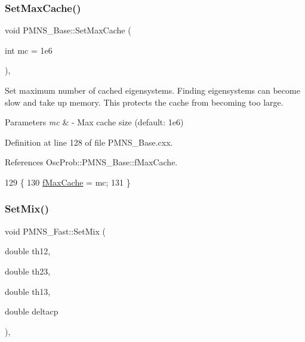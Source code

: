 \subsubsection{\texorpdfstring{Set\+Max\+Cache()}{SetMaxCache()}}
{\footnotesize\ttfamily void P\+M\+N\+S\+\_\+\+Base\+::\+Set\+Max\+Cache (\begin{DoxyParamCaption}\item[{int}]{mc = {\ttfamily 1e6} }\end{DoxyParamCaption})\hspace{0.3cm}{\ttfamily [virtual]}, {\ttfamily [inherited]}}

Set maximum number of cached eigensystems. Finding eigensystems can become slow and take up memory. This protects the cache from becoming too large.


\begin{DoxyParams}{Parameters}
{\em mc} & -\/ Max cache size (default\+: 1e6) \\
\hline
\end{DoxyParams}


Definition at line 128 of file P\+M\+N\+S\+\_\+\+Base.\+cxx.



References Osc\+Prob\+::\+P\+M\+N\+S\+\_\+\+Base\+::f\+Max\+Cache.


\begin{DoxyCode}
129 \{
130   \hyperlink{classOscProb_1_1PMNS__Base_a74c13356eafec2490d8c3c19759ba7f0}{fMaxCache} = mc;
131 \}
\end{DoxyCode}
\mbox{\label{classOscProb_1_1PMNS__Fast_ad849b2231d99c5d66fb3ade8efb896e1}} 
\subsubsection{\texorpdfstring{Set\+Mix()}{SetMix()}}
{\footnotesize\ttfamily void P\+M\+N\+S\+\_\+\+Fast\+::\+Set\+Mix (\begin{DoxyParamCaption}\item[{double}]{th12,  }\item[{double}]{th23,  }\item[{double}]{th13,  }\item[{double}]{deltacp }\end{DoxyParamCaption})\hspace{0.3cm}{\ttfamily [virtual]}, {\ttfamily [inherited]}}

